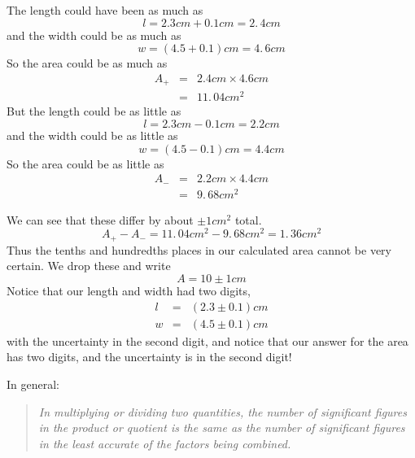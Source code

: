 \documentclass[]{Book}
\begin{document}
The length could have been as much as 
\begin{equation*}
	l=2.3\unit{cm}+0.1\unit{cm}=2.\,\allowbreak 4\unit{cm}
\end{equation*}%
and the width could be as much as 
\begin{equation*}
	w=\left( 4.5+0.1\right) \unit{cm}=4.\,\allowbreak 6\unit{cm}
\end{equation*}%
So the area could be as much as 
\begin{eqnarray*}
	A_{+} &=&2.4\unit{cm}\times 4.6\unit{cm} \\
	&=&\allowbreak 11.\,\allowbreak 04\unit{cm}^{2}
\end{eqnarray*}%
But the length could be as little as 
\begin{equation*}
	l=2.3\unit{cm}-0.1\unit{cm}=2.2\unit{cm}
\end{equation*}%
and the width could be as little as 
\begin{equation*}
	w=\left( 4.5-0.1\right) \unit{cm}=4.4\unit{cm}
\end{equation*}%
So the area could be as little as%
\begin{eqnarray*}
	A_{-} &=&2.2\unit{cm}\times 4.4\unit{cm} \\
	&=&\allowbreak 9.\,\allowbreak 68\unit{cm}^{2}
\end{eqnarray*}

We can see that these differ by about $\pm 1\unit{cm}^{2}$ total. 
\begin{equation*}
	A_{+}-A_{-}=11.\,\allowbreak 04\unit{cm}^{2}-\allowbreak \allowbreak
	9.\,\allowbreak 68\unit{cm}^{2}=1.\,\allowbreak 36\unit{cm}^{2}
\end{equation*}%
Thus the tenths and hundredths places in our calculated area cannot be very
certain. We drop these and write%
\begin{equation*}
	A=\allowbreak 10\pm 1\unit{cm}
\end{equation*}%
Notice that our length and width had two digits, 
\begin{eqnarray*}
	l &=&\left( 2.3\pm 0.1\right) \unit{cm} \\
	w &=&\left( 4.5\pm 0.1\right) \unit{cm}
\end{eqnarray*}%
with the uncertainty in the second digit, and notice that our answer for the
area has two digits, and the uncertainty is in the second digit!

In general:

\begin{quotation}
	\emph{In multiplying or dividing two quantities, the number of significant
		figures in the product or quotient is the same as the number of significant
		figures in the least accurate of the factors being combined. }
\end{quotation}
\end{document}
